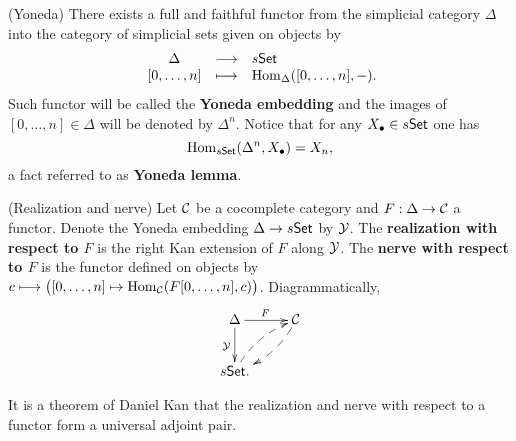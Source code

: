 \documentclass[thesis.tex]{subfiles}
\begin{document}
\begin{remark}(Yoneda)\label{Yoneda}
There exists a full and faithful functor from the simplicial category $\Delta$ into the category of simplicial sets given on objects by $$\begin{array}{ccl}
\ \Delta &\longrightarrow & s\mathsf{Set} \\
\ [0,\dotsc,n] &\longmapsto & \mathrm{Hom}_{\Delta}([0,\dotsc,n],-).
\end{array}$$
Such functor will be called the \textbf{Yoneda embedding} and the images of $[0,\dotsc,n]\in\Delta$ will be denoted by $\Delta^n$. Notice that for any $X_\bullet\in s\mathsf{Set}$ one has $$\mathrm{Hom}_{s\mathsf{Set}}(\Delta^n,X_\bullet)=X_n,$$
a fact referred to as \textbf{Yoneda lemma}.
\end{remark}

\begin{definition}(Realization and nerve) \label{realization and nerve}
Let $\operatorname{\mathcal{C}}$ be a cocomplete category and $F:\Delta\to\operatorname{\mathcal{C}}$ a functor. Denote the Yoneda embedding $\Delta\to s\mathsf{Set}$ by $\operatorname{\mathcal{Y}}$. The \textbf{realization with respect to $F$} is the right Kan extension of $F$ along $\operatorname{\mathcal{Y}}$. The \textbf{nerve with respect to $F$} is the functor defined on objects by $c \longmapsto \big([0,\dotsc,n]\mapsto\mathrm{Hom}_{\operatorname{\mathcal{C}}}(F[0,\dotsc,n],c)\big)$. Diagrammatically,
$$\xymatrix{\Delta\ar[r]^F\ar[d]_\Y & \C \ar@/^/@{-->}[dl] \\
s\Set. \ar@/^/@{-->}[ur] & }$$
\end{definition}

\begin{remark}
It is a theorem of Daniel Kan \cite{Kan58} that the realization and nerve with respect to a functor form a universal adjoint pair.
\end{remark}
\end{document}
